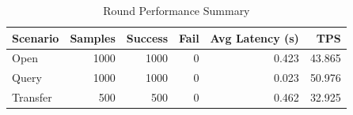 \begin{table}
\caption{Round Performance Summary}
\label{tab:round_perf}
\begin{tabular}{lrrrrr}
\toprule
Scenario & Samples & Success & Fail & Avg Latency (s) & TPS \\
\midrule
Open & 1000 & 1000 & 0 & 0.423 & 43.865 \\
Query & 1000 & 1000 & 0 & 0.023 & 50.976 \\
Transfer & 500 & 500 & 0 & 0.462 & 32.925 \\
\bottomrule
\end{tabular}
\end{table}
